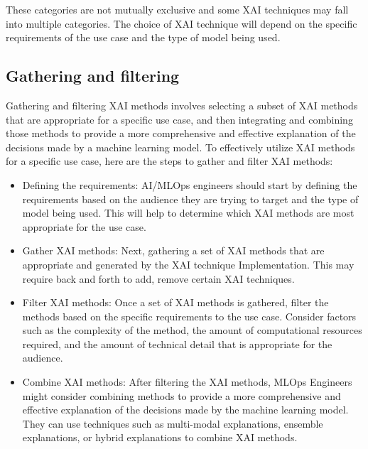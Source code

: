 \documentclass[conference]{IEEEtran}
\begin{document}
These categories are not mutually exclusive and some XAI techniques may fall into multiple categories. The choice of XAI technique will depend on the specific requirements of the use case and the type of model being used.

\subsection{Gathering and filtering} Gathering and filtering XAI methods involves selecting a subset of XAI methods that are appropriate for a specific use case, and then integrating and combining those methods to provide a more comprehensive and effective explanation of the decisions made by a machine learning model. To effectively utilize XAI methods for a specific use case, here are the steps to gather and filter XAI methods: 
\begin{itemize}
	\item Defining the requirements: AI/MLOps engineers should start by defining the requirements based on the audience they are trying to target and the type of model being used. This will help to determine which XAI methods are most appropriate for the use case.
	\item Gather XAI methods: Next, gathering a set of XAI methods that are appropriate and generated by the XAI technique Implementation. This may require back and forth to add, remove certain XAI techniques.
	\item Filter XAI methods: Once a set of XAI methods is gathered, filter the methods based on the specific requirements to the use case. Consider factors such as the complexity of the method, the amount of computational resources required, and the amount of technical detail that is appropriate for the audience.
	\item Combine XAI methods: After filtering the XAI methods, MLOps Engineers might consider combining methods to provide a more comprehensive and effective explanation of the decisions made by the machine learning model. They can use techniques such as multi-modal explanations, ensemble explanations, or hybrid explanations to combine XAI methods.
\end{itemize}
\end{document}
